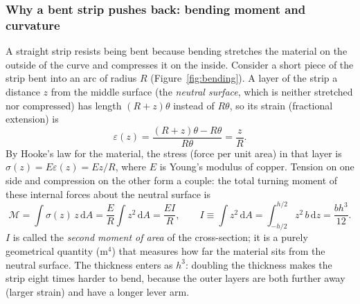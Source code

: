 \documentclass[11pt,a4paper]{article}
\newcommand{\dd}{\mathrm{d}}
\begin{document}
\subsubsection{Why a bent strip pushes back: bending moment and curvature}

A straight strip resists being bent because bending stretches the material on the outside of the curve and compresses it on the inside. Consider a short piece of the strip bent into an arc of radius $R$ (Figure~\ref{fig:bending}). A layer of the strip a distance $z$ from the middle surface (the \emph{neutral surface}, which is neither stretched nor compressed) has length $(R+z)\theta$ instead of $R\theta$, so its strain (fractional extension) is
\begin{equation}
\varepsilon(z)=\frac{(R+z)\theta-R\theta}{R\theta}=\frac{z}{R}.
\end{equation}
By Hooke's law for the material, the stress (force per unit area) in that layer is $\sigma(z)=E\varepsilon(z)=Ez/R$, where $E$ is Young's modulus of copper. Tension on one side and compression on the other form a couple: the total turning moment of these internal forces about the neutral surface is
\begin{equation}
\mathcal M=\int\sigma(z)\,z\,\dd A=\frac{E}{R}\int z^2\,\dd A=\frac{EI}{R},\qquad
I\equiv\int z^2\,\dd A=\int_{-h/2}^{h/2}z^2\,b\,\dd z=\frac{bh^3}{12}.
\label{eq:M_EI}
\end{equation}
$I$ is called the \emph{second moment of area} of the cross-section; it is a purely geometrical quantity ($\mathrm{m^4}$) that measures how far the material sits from the neutral surface. The thickness enters as $h^3$: doubling the thickness makes the strip eight times harder to bend, because the outer layers are both further away (larger strain) and have a longer lever arm.
\end{document}
